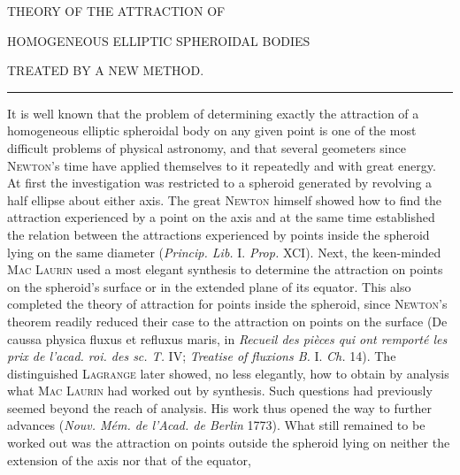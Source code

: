 \begin{center}
THEORY OF THE ATTRACTION OF\par
\bigskip
HOMOGENEOUS ELLIPTIC SPHEROIDAL BODIES\par
\bigskip
TREATED BY A NEW METHOD.\par
\medskip
\rule{.16\textwidth}{.3pt}
\end{center}
\par
It is well known that the problem of determining exactly the attraction of a homogeneous elliptic spheroidal body on any given point is one of the most difficult problems of physical astronomy, and that several geometers since \textsc{Newton}’s time have applied themselves to it repeatedly and with great energy. At first the investigation was restricted to a spheroid generated by revolving a half ellipse about either axis. The great \textsc{Newton} himself showed how to find the attraction experienced by a point on the axis and at the same time established the relation between the attractions experienced by points inside the spheroid lying on the same diameter (\textit{Princip. Lib.} I. \textit{Prop.} XCI). Next, the keen-minded \textsc{Mac Laurin} used a most elegant synthesis to determine the attraction on points on the spheroid’s surface or in the extended plane of its equator. This also completed the theory of attraction for points inside the spheroid, since \textsc{Newton}’s theorem readily reduced their case to the attraction on points on the surface (De caussa physica fluxus et refluxus maris, in \textit{Recueil des pièces qui ont remporté les prix de l’acad. roi. des sc. T.} IV; \textit{Treatise of fluxions B.} I. \textit{Ch.} 14). The distinguished \textsc{Lagrange} later showed, no less elegantly, how to obtain by analysis what \textsc{Mac Laurin} had worked out by synthesis. Such questions had previously seemed beyond the reach of analysis. His work thus opened the way to further advances (\textit{Nouv. Mém. de l’Acad. de Berlin} 1773). What still remained to be worked out was the attraction on points outside the spheroid lying on neither the extension of the axis nor that of the equator,

